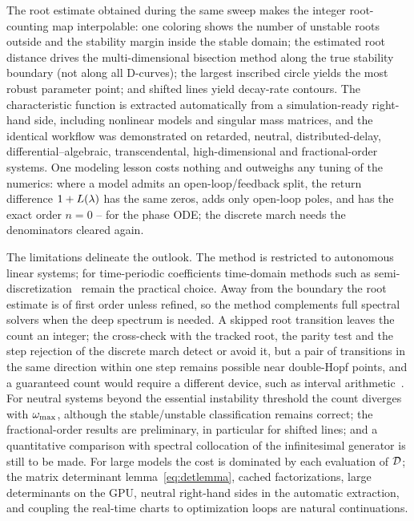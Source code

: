 The root estimate obtained during the same sweep makes the integer
root-counting map interpolable: one coloring shows the number of unstable
roots outside and the stability margin inside the stable domain; the
estimated root distance drives the multi-dimensional bisection method along
the true stability boundary (not along all D-curves); the largest inscribed
circle yields the most robust parameter point; and shifted lines yield
decay-rate contours. The characteristic function is extracted automatically
from a simulation-ready right-hand side, including nonlinear models and
singular mass matrices, and the identical workflow was demonstrated on
retarded, neutral, distributed-delay, differential--algebraic,
transcendental, high-dimensional and fractional-order systems. One modeling
lesson costs nothing and outweighs any tuning of the numerics: where a model
admits an open-loop/feedback split, the return difference $1+L(\lambda)$ has the
same zeros, adds only open-loop poles, and has the exact order $n=0$ -- for the
phase ODE; the discrete march needs the denominators cleared again.

The limitations delineate the outlook. The method is restricted to autonomous
linear systems; for time-periodic coefficients time-domain methods such as
semi-discretization~\cite{insperger2011semidiscretization,bachrathy2026multiplication}
remain the practical choice. Away from the boundary the root estimate is of
first order unless refined, so the method complements full spectral solvers
when the deep spectrum is needed. A skipped root transition leaves the count
an integer; the cross-check with the tracked root, the parity test and the
step rejection of the discrete march detect or avoid it, but a pair of
transitions in the same direction within one step remains possible near
double-Hopf points, and a guaranteed count would require a different device,
such as interval arithmetic~\cite{johnson2009enclosing}. For neutral systems
beyond the essential instability threshold the count diverges with $\omega_{\mathrm{max}}$,
although the stable/unstable classification remains correct; the
fractional-order results are preliminary, in particular for shifted lines; and
a quantitative comparison with spectral collocation of the infinitesimal
generator is still to be made. For large models the cost is dominated by each
evaluation of $\mathcal{D}$; the matrix determinant lemma~\eqref{eq:detlemma},
cached factorizations, large determinants on the GPU, neutral right-hand
sides in the automatic extraction, and coupling the real-time charts to
optimization loops are natural continuations.

